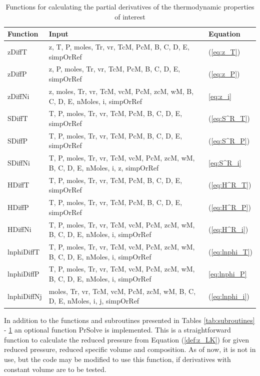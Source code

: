 \documentclass[english]{../thermomemo/thermomemo}
\numberwithin{equation}{section}
\newcommand*{\reff}[1]{(\ref{#1})}
\begin{document}
\begin{table}[t]
\begin{center}
\caption{Functions for calculating the partial derivatives of the thermodynamic properties of interest}
\label{tab:functionsTherm}
\begin{tabular}{l p{10cm} l}
\hline%
Function 	& Input   & Equation \\
\hline
zDiffT		& z, T, P, moles, Tr, vr, TcM, PcM, B, C, D, E, simpOrRef	& \reff{eq:z_T} \\
zDiffP		& z, P, moles, Tr, vr, TcM, PcM, B, C, D, E, simpOrRef	& \reff{eq:z_P} \\
zDiffNi		& z, moles, Tr, vr, TcM, vcM, PcM, zcM, wM, B, C, D, E, nMoles, i, simpOrRef	& \ref{eq:z_i} \\
SDiffT		& T, P, moles, Tr, vr, TcM, PcM, B, C, D, E, simpOrRef	& \reff{eq:S^R_T} \\
SDiffP		& T, P, moles, Tr, vr, TcM, PcM, B, C, D, E, simpOrRef	& \reff{eq:S^R_P} \\
SDiffNi		& T, P, moles, Tr, vr, TcM, vcM, PcM, zcM, wM, B, C, D, E, nMoles, i, z, simpOrRef	& \ref{eq:S^R_i} \\
HDiffT		& T, P, moles, Tr, vr, TcM, PcM, B, C, D, E, simpOrRef	& \reff{eq:H^R_T} \\
HDiffP		& T, P, moles, Tr, vr, TcM, PcM, B, C, D, E, simpOrRef	& \reff{eq:H^R_P} \\
HDiffNi		& T, P, moles, Tr, vr, TcM, vcM, PcM, zcM, wM, B, C, D, E, nMoles, i, simpOrRef	& \reff{eq:H^R_i} \\
lnphiDiffT	& T, P, moles, Tr, vr, TcM, vcM, PcM, zcM, wM, B, C, D, E, nMoles, i, simpOrRef	& \reff{eq:lnphi_T} \\
lnphiDiffP	& T, P, moles, Tr, vr, TcM, vcM, PcM, zcM, wM, B, C, D, E, nMoles, i, simpOrRef	& \ref{eq:lnphi_P} \\
lnphiDiffNj	& moles, Tr, vr, TcM, vcM, PcM, zcM, wM, B, C, D, E, nMoles, i, j, simpOrRef	& \reff{eq:lnphi_i} \\
\hline
\end{tabular}
\end{center}
\end{table}
\clearpage
In addition to the functions and subroutines presented in Tables \ref{tab:subroutines} - \ref{tab:functionsTherm} an optional function PrSolve is implemented. This is a straightforward function to calculate the reduced pressure from Equation \reff{def:z_LK} for given reduced pressure, reduced specific volume and composition. As of now, it is not in use, but the code may be modified to use this function, if derivatives with constant volume are to be tested.
\end{document}
